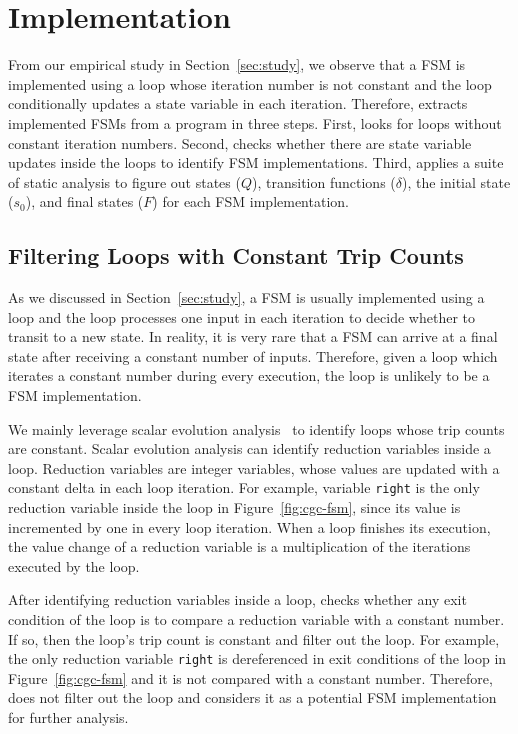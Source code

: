 \section{Implementation}
\label{sec:impl}

From our empirical study in Section~\ref{sec:study},
we observe that a FSM is implemented using a loop 
whose iteration number is not constant  
and the loop conditionally updates a state variable in each iteration. 
Therefore, \Tool{} extracts implemented FSMs from a program in three steps.
First, \Tool{} looks for loops without constant iteration numbers. 
Second, \Tool{} checks whether there are state 
variable updates inside the loops to identify FSM implementations. 
Third, \Tool{} applies a suite 
of static analysis to figure out states ($Q$), 
transition functions ($\delta$), the initial state ($s_0$),
and final states ($F$) for each FSM implementation. 


\subsection{Filtering Loops with Constant Trip Counts}
As we discussed in Section~\ref{sec:study},
a FSM is usually implemented using a loop 
and the loop processes one input in each iteration to decide 
whether to transit to a new state. 
In reality, it is very rare that a FSM can arrive at a final state 
after receiving a constant number of inputs. 
Therefore, given a loop which iterates a constant 
number during every execution, 
the loop is unlikely to be a FSM implementation. 


We mainly leverage scalar evolution analysis~\cite{scalar-1,scalar-2,scalar-3} 
to identify loops whose trip counts are constant. 
Scalar evolution analysis can identify reduction variables inside a loop.
Reduction variables are integer variables, 
whose values are updated 
with a constant delta in each loop iteration. 
For example, variable \texttt{right} is the only reduction 
variable inside the loop in Figure~\ref{fig:cgc-fsm}, 
since its value is incremented by one in every loop iteration.  
When a loop finishes its execution, the value change of a 
reduction variable is a multiplication of 
the iterations executed by the loop. 

After identifying reduction variables inside a loop,
\Tool{} checks whether any exit condition of the loop is to compare 
a reduction variable with a constant number. 
If so, then the loop’s trip count is constant and \Tool{} filter out the loop. 
For example, the only reduction variable \texttt{right} is dereferenced 
in exit conditions of the loop in Figure~\ref{fig:cgc-fsm} 
and it is not compared with a constant number.
Therefore, \Tool{} does not filter out the loop and considers it 
as a potential FSM implementation 
for further analysis. 


